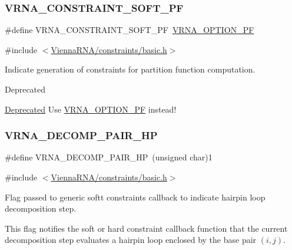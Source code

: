 \subsubsection{\texorpdfstring{VRNA\_CONSTRAINT\_SOFT\_PF}{VRNA\_CONSTRAINT\_SOFT\_PF}}
{\footnotesize\ttfamily \#define V\+R\+N\+A\+\_\+\+C\+O\+N\+S\+T\+R\+A\+I\+N\+T\+\_\+\+S\+O\+F\+T\+\_\+\+PF~\mbox{\hyperlink{group__fold__compound_gabfbadcddda3e74ce7f49035ef8f058f7}{V\+R\+N\+A\+\_\+\+O\+P\+T\+I\+O\+N\+\_\+\+PF}}}



{\ttfamily \#include $<$\mbox{\hyperlink{constraints_2basic_8h}{Vienna\+R\+N\+A/constraints/basic.\+h}}$>$}



Indicate generation of constraints for partition function computation. 

\begin{DoxyRefDesc}{Deprecated}
\item[\mbox{\hyperlink{deprecated__deprecated000156}{Deprecated}}]Use \mbox{\hyperlink{group__fold__compound_gabfbadcddda3e74ce7f49035ef8f058f7}{V\+R\+N\+A\+\_\+\+O\+P\+T\+I\+O\+N\+\_\+\+PF}} instead!\end{DoxyRefDesc}
\mbox{\label{group__constraints_ga8bd41ebc8039378d242e4e8c273716a5}} 
\subsubsection{\texorpdfstring{VRNA\_DECOMP\_PAIR\_HP}{VRNA\_DECOMP\_PAIR\_HP}}
{\footnotesize\ttfamily \#define V\+R\+N\+A\+\_\+\+D\+E\+C\+O\+M\+P\+\_\+\+P\+A\+I\+R\+\_\+\+HP~(unsigned char)1}



{\ttfamily \#include $<$\mbox{\hyperlink{constraints_2basic_8h}{Vienna\+R\+N\+A/constraints/basic.\+h}}$>$}



Flag passed to generic softt constraints callback to indicate hairpin loop decomposition step. 

This flag notifies the soft or hard constraint callback function that the current decomposition step evaluates a hairpin loop enclosed by the base pair $(i,j)$.

